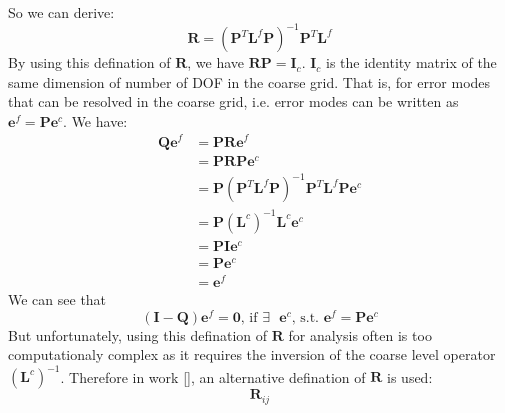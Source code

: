 So we can derive:
\begin{equation}
 \mathbf{R} = (\mathbf{P}^T\mathbf{L}^f\mathbf{P})^{-1}\mathbf{P}^T\mathbf{L}^f
\end{equation}
By using this defination of $\mathbf{R}$, we have $\mathbf{R}\mathbf{P} = \mathbf{I}_c$. $\mathbf{I}_c$ is the identity matrix of the same dimension of number of DOF in the coarse grid. That is, for error modes that can be resolved in the coarse grid, i.e. error modes can be written as $\mathbf{e}^f = \mathbf{P}\mathbf{e}^c$. We have:
\begin{align*}
\mathbf{Q}\mathbf{e}^f &= \mathbf{P}\mathbf{R}\mathbf{e}^f\\
&= \mathbf{P}\mathbf{R}\mathbf{P}\mathbf{e}^c\\
&= \mathbf{P}(\mathbf{P}^T\mathbf{L}^f\mathbf{P})^{-1}\mathbf{P}^T\mathbf{L}^f\mathbf{P}\mathbf{e}^c\\
&= \mathbf{P}(\mathbf{L}^c)^{-1}\mathbf{L}^c\mathbf{e}^c\\
&= \mathbf{P}\mathbf{I}\mathbf{e}^c\\
&= \mathbf{P}\mathbf{e}^c \\
&= \mathbf{e}^f
\end{align*}
We can see that 
$$
(\mathbf{I} - \mathbf{Q})\mathbf{e}^f = \mathbf{0}\text{, if $\exists$ $\mathbf{e}^c$, s.t. }\mathbf{e}^f = \mathbf{P}\mathbf{e}^c
$$
But unfortunately, using this defination of $\mathbf{R}$ for analysis often is too computationaly complex as it requires the inversion of the coarse level operator $(\mathbf{L}^c)^{-1}$. Therefore in work [\cite{brezina2001algebraic}], an alternative defination of $\mathbf{R}$ is used:
$$
\mathbf{R}_{ij}
$$
